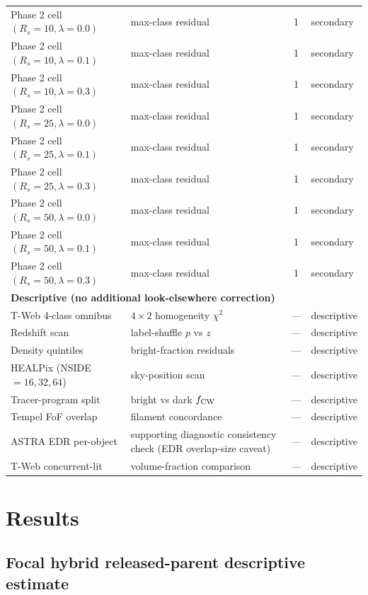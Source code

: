 \documentclass[twocolumn,linenumbers]{aastex702}
\begin{document}
\begin{table}[ht]
{\begin{tabular}{llcl}
Phase 2 cell $(R_s=10,\lambda=0.0)$ & max-class residual & 1 & secondary \\
Phase 2 cell $(R_s=10,\lambda=0.1)$ & max-class residual & 1 & secondary \\
Phase 2 cell $(R_s=10,\lambda=0.3)$ & max-class residual & 1 & secondary \\
Phase 2 cell $(R_s=25,\lambda=0.0)$ & max-class residual & 1 & secondary \\
Phase 2 cell $(R_s=25,\lambda=0.1)$ & max-class residual & 1 & secondary \\
Phase 2 cell $(R_s=25,\lambda=0.3)$ & max-class residual & 1 & secondary \\
Phase 2 cell $(R_s=50,\lambda=0.0)$ & max-class residual & 1 & secondary \\
Phase 2 cell $(R_s=50,\lambda=0.1)$ & max-class residual & 1 & secondary \\
Phase 2 cell $(R_s=50,\lambda=0.3)$ & max-class residual & 1 & secondary \\
\hline
\multicolumn{4}{l}{\textbf{Descriptive (no additional look-elsewhere correction)}} \\
T-Web 4-class omnibus & $4\!\times\!2$ homogeneity $\chi^2$ & --- & descriptive \\
Redshift scan & label-shuffle $p$ vs $z$ & --- & descriptive \\
Density quintiles & bright-fraction residuals & --- & descriptive \\
HEALPix (NSIDE $=16,32,64$) & sky-position scan & --- & descriptive \\
Tracer-program split & bright vs dark $f_{\rm CW}$ & --- & descriptive \\
Tempel FoF overlap & filament concordance & --- & descriptive \\
ASTRA EDR per-object & supporting diagnostic consistency check (EDR overlap-size caveat) & --- & descriptive \\
T-Web concurrent-lit & volume-fraction comparison & --- & descriptive \\
\end{tabular}
}
\end{table}

\section{Results}\label{sec:results}

\subsection{Focal hybrid released-parent descriptive estimate}\label{sec:focal_result_first}
\end{document}
